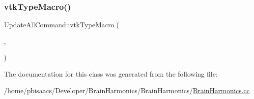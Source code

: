 \subsubsection{\texorpdfstring{vtk\+Type\+Macro()}{vtkTypeMacro()}}
{\footnotesize\ttfamily Update\+All\+Command\+::vtk\+Type\+Macro (\begin{DoxyParamCaption}\item[{\mbox{\hyperlink{classUpdateAllCommand}{Update\+All\+Command}}}]{,  }\item[{vtk\+Command}]{ }\end{DoxyParamCaption})}



The documentation for this class was generated from the following file\+:\begin{DoxyCompactItemize}
\item 
/home/pbisaacs/\+Developer/\+Brain\+Harmonics/\+Brain\+Harmonics/\mbox{\hyperlink{BrainHarmonics_8cc}{Brain\+Harmonics.\+cc}}\end{DoxyCompactItemize}
